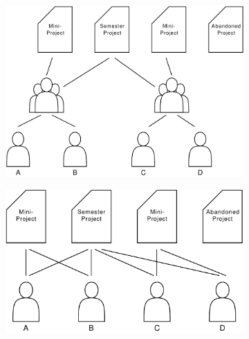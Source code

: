 \begin{figure}[p]%
\centering
        \begin{subfigure}[b]{0.8\textwidth}
                \centering
                \includegraphics[width=\textwidth]{images/groupprojectdivision.pdf}
                \label{fig:divProjGroup:div}
        \end{subfigure}%
				\vspace{10mm}
        \begin{subfigure}[b]{0.8\textwidth}
                \centering
                \includegraphics[width=\textwidth]{images/groupprojectunited.pdf}
                \label{fig:divProjGroup:united}
        \end{subfigure}%
%
\label{fig:divProjGroup}%
\end{figure}

